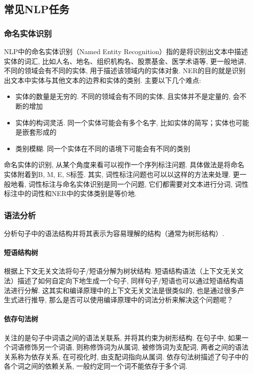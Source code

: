 \subsection{常见NLP任务}

\subsubsection{命名实体识别}
NLP中的命名实体识别（Named Entity Recognition）指的是将识别出文本中描述实体的词汇, 比如人名、地名、组织机构名、股票基金、医学术语等, 更一般地讲, 不同的领域会有不同的实体, 用于描述该领域内的实体对象. NER的目的就是识别出文本中实体与其他文本的边界和实体的类别. 主要以下几个难点: 
\begin{itemize}
	\item 实体的数量是无穷的. 不同的领域会有不同的实体, 且实体并不是定量的, 会不断的增加
	\item 实体的构词灵活. 同一个实体可能会有多个名字, 比如实体的简写；实体也可能是嵌套形成的
	\item 类别模糊. 同一个实体在不同的语境下可能会有不同的类别
\end{itemize}

命名实体的识别, 从某个角度来看可以视作一个序列标注问题. 具体做法是将命名实体附着到{B, M, E, S}标签. 其实, 词性标注问题也可以以这样的方法来处理. 更一般地看, 词性标注与命名实体识别是同一个问题, 它们都需要对文本进行分词, 词性标注中的词性和NER中的实体类别是等价地. 

\subsubsection{语法分析}
分析句子中的语法结构并将其表示为容易理解的结构（通常为树形结构）. 
\paragraph{短语结构树}根据上下文无关文法将句子/短语分解为树状结构. 短语结构语法（上下文无关文法）描述了如何自定向下地生成一个句子, 同样句子/短语也可以通过短语结构语法进行分解. 这其实和编译原理中的上下文无关文法是很类似的, 也是通过很多产生式进行推导, 那么是否可以使用编译原理中的词法分析来解决这个问题呢？

\paragraph{依存句法树}关注的是句子中词语之间的语法关联系, 并将其约束为树形结构. 在句子中, 如果一个词语修饰另一个词语, 则称修饰词为从属词, 被修饰词为支配词, 两者之间的语法关系称为依存关系, 在可视化时, 由支配词指向从属词. 依存句法树描述了句子中的各个词之间的依赖关系, 一般约定同一个词不能依存于多个词. 

